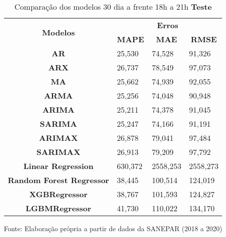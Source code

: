 \begin{table}[H]
	\centering
	\caption{Comparação dos modelos 30 dia a frente 18h a 21h \textbf{Teste} }\label{tb:30-18tst}
	\begin{tabular}{@{}clll@{}}
		\toprule
		\multirow{2}{*}{\textbf{Modelos}} & \multicolumn{3}{c}{\textbf{Erros}}                                                                       \\ \cmidrule(l){2-4} 
		& \multicolumn{1}{c}{\textbf{MAPE}} & \multicolumn{1}{c}{\textbf{MAE}} & \multicolumn{1}{c}{\textbf{RMSE}} \\ \hline
\textbf{AR}                       & 25,530                            & 74,528                           & 91,326                            \\
\textbf{ARX}                      & 26,737                            & 78,549                           & 97,073                            \\
\textbf{MA}                       & 25,662                            & 74,939                           & 92,055                            \\
\textbf{ARMA}                     & 25,256                            & 74,048                           & 90,948                            \\
\textbf{ARIMA}                    & 25,211                            & 74,378                           & 91,045                            \\
\textbf{SARIMA}                   & 25,247                            & 74,166                           & 91,191                            \\
\textbf{ARIMAX}                   & 26,878                            & 79,041                           & 97,484                            \\
\textbf{SARIMAX}                  & 26,913                            & 79,209                           & 97,792                            \\
\textbf{Linear Regression}        & 630,372                           & 2558,253                         & 2558,273                          \\
\textbf{Random Forest Regressor}  & 38,445                            & 100,514                          & 124,019                           \\
\textbf{XGBRegressor}             & 38,767                            & 101,593                          & 124,827                           \\
\textbf{LGBMRegressor}            & 41,730                            & 110,022                          & 134,170                           \\ \bottomrule
	\end{tabular}

Fonte: Elaboração própria a partir de dados da SANEPAR (2018 a 2020)
\end{table}

